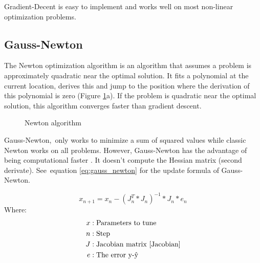 \documentclass[11pt,a4paper,titlepage,oneside]{report}
\begin{document}
Gradient-Decent is easy to implement and works well on most non-linear optimization problems.

\subsection{Gauss-Newton}
The Newton optimization algorithm is an algorithm that assumes a problem is approximately quadratic near the optimal solution. It fits a polynomial at the current location, derives this and jump to the position where the derivation of this polynomial is zero (Figure \ref{fig:newton}a). If the problem is quadratic near the optimal solution, this algorithm converges faster than gradient descent.

\begin{figure}[H]
	\centering
	\qquad
	\caption{Newton algorithm}
	\label{fig:newton}
\end{figure}

Gauss-Newton, only works to minimize a sum of squared values while classic Newton works on all problems. However, Gauss-Newton has the advantage of being computational faster \cite{gauss_newton}. It doesn't compute the Hessian matrix (second derivate). See equation \ref{eq:gauss_newton} for the update formula of Gauss-Newton. 

\begin{equation}\label{eq:gauss_newton}
  x_{n+1} = x_n - (J_n^T*J_n)^{-1}*J_n*e_n
\end{equation}
Where:
\begin{align*}
  x		  &: \text{Parameters to tune}\\
  n		  &: \text{Step}\\
	J		  &: \text{Jacobian matrix \cite{Jacobian}}\\
  e  	  &: \text{The error y-ŷ}
\end{align*}
\end{document}

